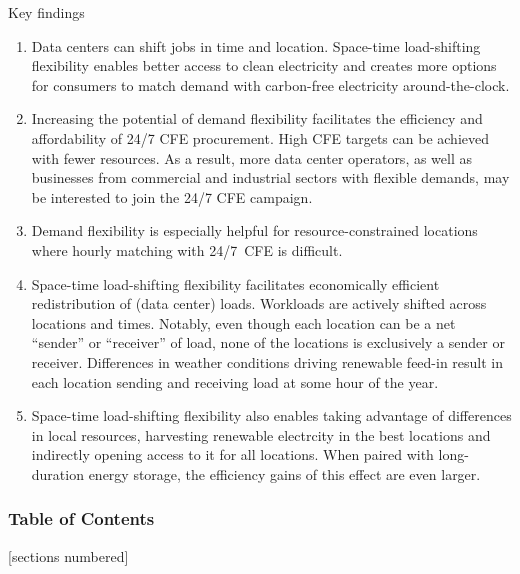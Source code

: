 \begin{frame}{Key findings}

  \centering
  {\footnotesize

    \begin{enumerate}
      \vspace{-0.2cm}
      \item Data centers can shift jobs in time and location. Space-time load-shifting flexibility enables \alert{better access to clean electricity} and creates \alert{more options} for consumers to match demand with carbon-free electricity around-the-clock. 

      \item Increasing the potential of demand flexibility facilitates the \alert{efficiency and affordability} of 24/7 CFE procurement. High CFE targets can be achieved with fewer resources. As a result, more data center operators, as well as businesses from commercial and industrial sectors with flexible demands, may be interested to join the 24/7 CFE campaign.

      \item Demand flexibility is especially \alert{helpful for resource-constrained locations} where hourly matching with 24/7~CFE is difficult.

      \item Space-time load-shifting flexibility facilitates \alert{economically efficient redistribution of (data center) loads}. Workloads are actively shifted across locations and times. Notably, even though each location can be a net \enquote{sender} or  \enquote{receiver} of load, none of the locations is exclusively a sender or receiver. Differences in weather conditions driving renewable feed-in result in each location sending and receiving load at some hour of the year.

      \item Space-time load-shifting flexibility also enables taking advantage of differences in local resources, harvesting renewable electrcity in the best locations and indirectly \alert{opening access to it for all locations}. When paired with long-duration energy storage, the efficiency gains of this effect are even larger.
  \end{enumerate}
  }
  
\end{frame}



\begin{frame}
  \frametitle{Table of Contents}
  {\small
  [sections numbered]
  \tableofcontents[hideallsubsections]
  }
\end{frame}


